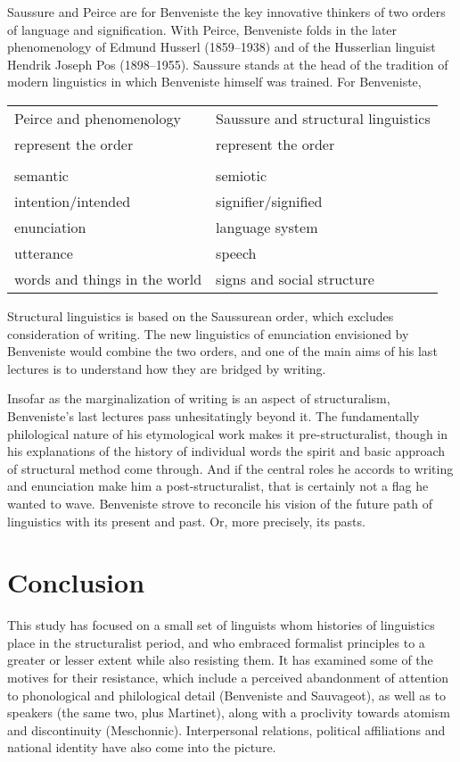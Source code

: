 \documentclass[output=paper]{langscibook}
\begin{document}
Saussure and Peirce are for Benveniste the key innovative thinkers of two orders of language and signification. With Peirce, Benveniste folds in the later phenomenology of Edmund Husserl (1859--1938) and of the Husserlian linguist Hendrik Joseph Pos (1898--1955). Saussure stands at the head of the tradition of modern linguistics in which Benveniste himself was trained. For Benveniste,

\begin{table}
\begin{tabular}{l l}
    Peirce and phenomenology & Saussure and structural linguistics \\
    represent the order & represent the order \\
     & \\
    semantic & semiotic \\
    intention/intended & signifier/signified \\
    enunciation & language system \\
    utterance & speech \\
    words and things in the world & signs and social structure
\end{tabular}
\end{table}

Structural linguistics is based on the Saussurean order, which excludes consideration of writing. The new linguistics of enunciation envisioned by Benveniste would combine the two orders, and one of the main aims of his last lectures is to understand how they are bridged by writing.

Insofar as the marginalization of writing is an aspect of structuralism, Benveniste’s last lectures pass unhesitatingly beyond it. The fundamentally philological nature of his etymological work makes it pre-structuralist, though in his explanations of the history of individual words the spirit and basic approach of structural method come through. And if the central roles he accords to writing and enunciation make him a post-structuralist, that is certainly not a flag he wanted to wave. Benveniste strove to reconcile his vision of the future path of linguistics with its present and past. Or, more precisely, its pasts.

\section{Conclusion}
\label{sec:joseph:conc}

This study has focused on a small set of linguists whom histories of linguistics place in the structuralist period, and who embraced formalist principles to a greater or lesser extent while also resisting them. It has examined some of the motives for their resistance, which include a perceived abandonment of attention to phonological and philological detail (Benveniste and Sauvageot), as well as to speakers (the same two, plus Martinet), along with a proclivity towards atomism and discontinuity (Meschonnic). Interpersonal relations, political affiliations and national identity have also come into the picture.
\end{document}
